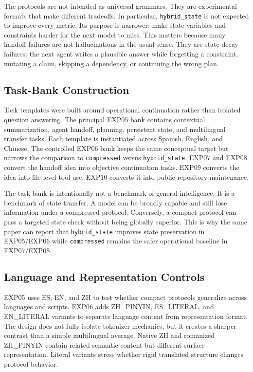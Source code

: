 \documentclass[11pt]{article}
\begin{document}
The protocols are not intended as universal grammars. They are experimental formats that make different tradeoffs. In particular, \texttt{hybrid\_state} is not expected to improve every metric. Its purpose is narrower: make state variables and constraints harder for the next model to miss. This matters because many handoff failures are not hallucinations in the usual sense. They are state-decay failures: the next agent writes a plausible answer while forgetting a constraint, mutating a claim, skipping a dependency, or continuing the wrong plan.

\subsection{Task-Bank Construction}
Task templates were built around operational continuation rather than isolated question answering. The principal EXP05 bank contains contextual summarization, agent handoff, planning, persistent state, and multilingual transfer tasks. Each template is instantiated across Spanish, English, and Chinese. The controlled EXP06 bank keeps the same conceptual target but narrows the comparison to \texttt{compressed} versus \texttt{hybrid\_state}. EXP07 and EXP08 convert the handoff idea into objective continuation tasks. EXP09 converts the idea into file-level tool use. EXP10 converts it into public repository maintenance.

The task bank is intentionally not a benchmark of general intelligence. It is a benchmark of state transfer. A model can be broadly capable and still lose information under a compressed protocol. Conversely, a compact protocol can pass a targeted state check without being globally superior. This is why the same paper can report that \texttt{hybrid\_state} improves state preservation in EXP05/EXP06 while \texttt{compressed} remains the safer operational baseline in EXP07/EXP08.

\subsection{Language and Representation Controls}
EXP05 uses ES, EN, and ZH to test whether compact protocols generalize across languages and scripts. EXP06 adds ZH\_PINYIN, ES\_LITERAL, and EN\_LITERAL variants to separate language content from representation format. The design does not fully isolate tokenizer mechanics, but it creates a sharper contrast than a simple multilingual average. Native ZH and romanized ZH\_PINYIN contain related semantic content but different surface representation. Literal variants stress whether rigid translated structure changes protocol behavior.
\end{document}
